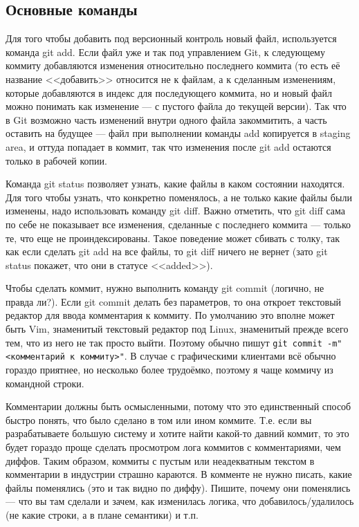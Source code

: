 \documentclass{../../text-style}
\begin{document}
\subsection{Основные команды}

Для того чтобы добавить под версионный контроль новый файл, используется команда git add. Если файл уже и так под управлением Git, к следующему коммиту добавляются изменения относительно последнего коммита (то есть её название <<добавить>> относится не к файлам, а к сделанным изменениям, которые добавляются в индекс для последующего коммита, но и новый файл можно понимать как изменение --- с пустого файла до текущей версии). Так что в Git возможно часть изменений внутри одного файла закоммитить, а часть оставить на будущее --- файл при выполнении команды add копируется в staging area, и оттуда попадает в коммит, так что изменения после git add остаются только в рабочей копии.

Команда git status позволяет узнать, какие файлы в каком состоянии находятся. Для того чтобы узнать, что конкретно поменялось, а не только какие файлы были изменены, надо использовать команду git diff. Важно отметить, что git diff сама по себе не показывает все изменения, сделанные с последнего коммита --- только те, что еще не проиндексированы. Такое поведение может сбивать с толку, так как если сделать git add на все файлы, то git diff ничего не вернет (зато git status покажет, что они в статусе <<added>>).

Чтобы сделать коммит, нужно выполнить команду git commit (логично, не правда ли?). Если git commit делать без параметров, то она откроет текстовый редактор для ввода комментария к коммиту. По умолчанию это вполне может быть Vim, знаменитый текстовый редактор под Linux, знаменитый прежде всего тем, что из него не так просто выйти. Поэтому обычно пишут \verb|git commit -m"<комментарий к коммиту>"|. В случае с графическими клиентами всё обычно гораздо приятнее, но несколько более трудоёмко, поэтому я чаще коммичу из командной строки.

Комментарии должны быть осмысленными, потому что это единственный способ быстро понять, что было сделано в том или ином коммите. Т.е. если вы разрабатываете большую систему и хотите найти какой-то давний коммит, то это будет гораздо проще сделать просмотром лога коммитов с комментариями, чем диффов. Таким образом, коммиты с пустым или неадекватным текстом в комментарии в индустрии страшно караются. В комменте не нужно писать, какие файлы поменялись (это и так видно по диффу). Пишите, почему они поменялись --- что вы там сделали и зачем, как изменилась логика, что добавилось/удалилось (не какие строки, а в плане семантики) и т.п.
\end{document}
